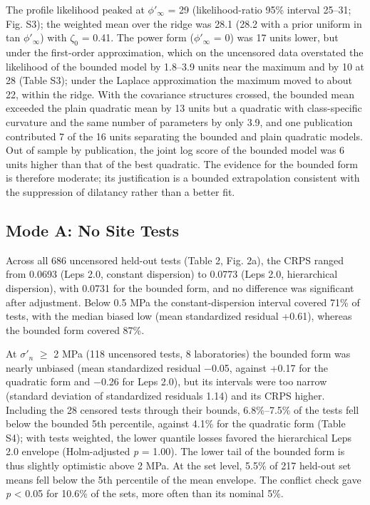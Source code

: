\documentclass[Journal,letterpaper]{ascelike-new}
\begin{document}
The profile likelihood peaked at $\phi'_\infty$ = 29\textdegree{} (likelihood-ratio 95\% interval 25--31\textdegree{}; Fig. S3); the weighted mean over the ridge was 28.1\textdegree{} (28.2\textdegree{} with a prior uniform in tan $\phi'_\infty$) with $\zeta_0$ = 0.41. The power form ($\phi'_\infty$ = 0) was 17 units lower, but under the first-order approximation, which on the uncensored data overstated the likelihood of the bounded model by 1.8--3.9 units near the maximum and by 10 at 28\textdegree{} (Table S3); under the Laplace approximation the maximum moved to about 22\textdegree{}, within the ridge. With the covariance structures crossed, the bounded mean exceeded the plain quadratic mean by 13 units but a quadratic with class-specific curvature and the same number of parameters by only 3.9, and one publication contributed 7 of the 16 units separating the bounded and plain quadratic models. Out of sample by publication, the joint log score of the bounded model was 6 units higher than that of the best quadratic. The evidence for the bounded form is therefore moderate; its justification is a bounded extrapolation consistent with the suppression of dilatancy rather than a better fit.

\subsection{Mode A: No Site Tests}
Across all 686 uncensored held-out tests (Table 2, Fig. 2a), the CRPS ranged from 0.0693 (Leps 2.0, constant dispersion) to 0.0773 (Leps 2.0, hierarchical dispersion), with 0.0731 for the bounded form, and no difference was significant after adjustment. Below 0.5 MPa the constant-dispersion interval covered 71\% of tests, with the median biased low (mean standardized residual +0.61), whereas the bounded form covered 87\%.

At $\sigma'_n$ $\ge$ 2 MPa (118 uncensored tests, 8 laboratories) the bounded form was nearly unbiased (mean standardized residual $-$0.05, against +0.17 for the quadratic form and $-$0.26 for Leps 2.0), but its intervals were too narrow (standard deviation of standardized residuals 1.14) and its CRPS higher. Including the 28 censored tests through their bounds, 6.8\%--7.5\% of the tests fell below the bounded 5th percentile, against 4.1\% for the quadratic form (Table S4); with tests weighted, the lower quantile losses favored the hierarchical Leps 2.0 envelope (Holm-adjusted \textit{p} = 1.00). The lower tail of the bounded form is thus slightly optimistic above 2 MPa. At the set level, 5.5\% of 217 held-out set means fell below the 5th percentile of the mean envelope. The conflict check gave \textit{p} < 0.05 for 10.6\% of the sets, more often than its nominal 5\%.
\end{document}
